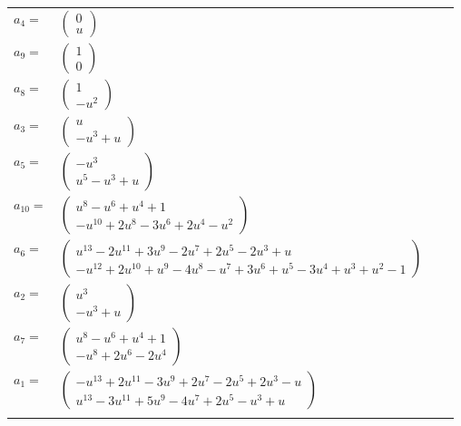\documentclass[1p]{elsarticle_modified}
\theoremstyle{definition}
\begin{document}
\begin{tabular}{m{7pt} m{180pt} m{7pt} m{180pt} }
\flushright $a_{4}=$&$\begin{pmatrix}0\\u\end{pmatrix}$ \\
\flushright $a_{9}=$&$\begin{pmatrix}1\\0\end{pmatrix}$ \\
\flushright $a_{8}=$&$\begin{pmatrix}1\\- u^2\end{pmatrix}$ \\
\flushright $a_{3}=$&$\begin{pmatrix}u\\- u^3+u\end{pmatrix}$ \\
\flushright $a_{5}=$&$\begin{pmatrix}- u^3\\u^5- u^3+u\end{pmatrix}$ \\
\flushright $a_{10}=$&$\begin{pmatrix}u^8- u^6+u^4+1\\- u^{10}+2 u^8-3 u^6+2 u^4- u^2\end{pmatrix}$ \\
\flushright $a_{6}=$&$\begin{pmatrix}u^{13}-2 u^{11}+3 u^9-2 u^7+2 u^5-2 u^3+u\\- u^{12}+2 u^{10}+u^9-4 u^8- u^7+3 u^6+u^5-3 u^4+u^3+u^2-1\end{pmatrix}$ \\
\flushright $a_{2}=$&$\begin{pmatrix}u^3\\- u^3+u\end{pmatrix}$ \\
\flushright $a_{7}=$&$\begin{pmatrix}u^8- u^6+u^4+1\\- u^8+2 u^6-2 u^4\end{pmatrix}$ \\
\flushright $a_{1}=$&$\begin{pmatrix}- u^{13}+2 u^{11}-3 u^9+2 u^7-2 u^5+2 u^3- u\\u^{13}-3 u^{11}+5 u^9-4 u^7+2 u^5- u^3+u\end{pmatrix}$\\&\end{tabular}
\end{document}
